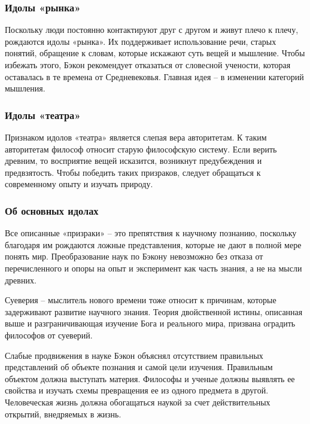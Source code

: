 \documentclass[
]{article}
\begin{document}
\hypertarget{ux438ux434ux43eux43bux44b-ux440ux44bux43dux43aux430}{%
\subsubsection{Идолы
«рынка»}\label{ux438ux434ux43eux43bux44b-ux440ux44bux43dux43aux430}}

Поскольку люди постоянно контактируют друг с другом и живут плечо к
плечу, рождаются идолы «рынка». Их поддерживает использование речи,
старых понятий, обращение к словам, которые искажают суть вещей и
мышление. Чтобы избежать этого, Бэкон рекомендует отказаться от
словесной учености, которая оставалась в те времена от Средневековья.
Главная идея -- в изменении категорий мышления.

\hypertarget{ux438ux434ux43eux43bux44b-ux442ux435ux430ux442ux440ux430}{%
\subsubsection{Идолы
«театра»}\label{ux438ux434ux43eux43bux44b-ux442ux435ux430ux442ux440ux430}}

Признаком идолов «театра» является слепая вера авторитетам. К таким
авторитетам философ относит старую философскую систему. Если верить
древним, то восприятие вещей исказится, возникнут предубеждения и
предвзятость. Чтобы победить таких призраков, следует обращаться к
современному опыту и изучать природу.

\hypertarget{ux43eux431-ux43eux441ux43dux43eux432ux43dux44bux445-ux438ux434ux43eux43bux430ux445}{%
\subsubsection{Об основных
идолах}\label{ux43eux431-ux43eux441ux43dux43eux432ux43dux44bux445-ux438ux434ux43eux43bux430ux445}}

Все описанные «призраки» -- это препятствия к научному познанию,
поскольку благодаря им рождаются ложные представления, которые не дают в
полной мере понять мир. Преобразование наук по Бэкону невозможно без
отказа от перечисленного и опоры на опыт и эксперимент как часть знания,
а не на мысли древних.

Суеверия -- мыслитель нового времени тоже относит к причинам, которые
задерживают развитие научного знания. Теория двойственной истины,
описанная выше и разграничивающая изучение Бога и реального мира,
призвана оградить философов от суеверий.

Слабые продвижения в науке Бэкон объяснял отсутствием правильных
представлений об объекте познания и самой цели изучения. Правильным
объектом должна выступать материя. Философы и ученые должны выявлять ее
свойства и изучать схемы превращения ее из одного предмета в другой.
Человеческая жизнь должна обогащаться наукой за счет действительных
открытий, внедряемых в жизнь.
\end{document}
